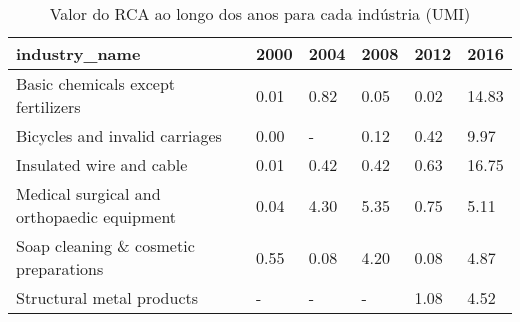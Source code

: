 \begin{table}
\centering
\caption{Valor do RCA ao longo dos anos para cada indústria (UMI)}
\begin{tabular}{p{6cm}p{1.5cm}p{1.5cm}p{1.5cm}p{1.5cm}p{1.5cm}}
\toprule
                             industry\_name & 2000 & 2004 & 2008 & 2012 &  2016 \\
\midrule
        Basic chemicals except fertilizers & 0.01 & 0.82 & 0.05 & 0.02 & 14.83 \\
            Bicycles and invalid carriages & 0.00 &    - & 0.12 & 0.42 &  9.97 \\
                  Insulated wire and cable & 0.01 & 0.42 & 0.42 & 0.63 & 16.75 \\
Medical surgical and orthopaedic equipment & 0.04 & 4.30 & 5.35 & 0.75 &  5.11 \\
     Soap cleaning \& cosmetic preparations & 0.55 & 0.08 & 4.20 & 0.08 &  4.87 \\
                 Structural metal products &    - &    - &    - & 1.08 &  4.52 \\
\bottomrule
\end{tabular}
\end{table}
